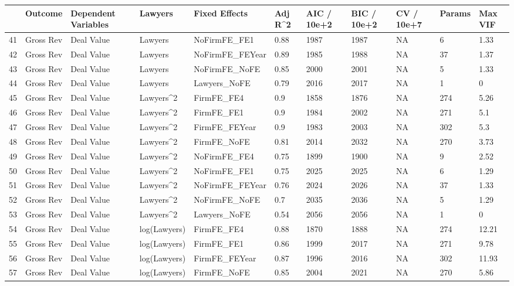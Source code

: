 \documentclass{article}
\begin{document}
\begin{table}[H]
\centering
\begin{tabular}{rllllllllll}
  \hline
 & Outcome & Dependent Variables & Lawyers & Fixed Effects & Adj R^2 & AIC / 10e+2 & BIC / 10e+2 & CV / 10e+7 & Params & Max VIF \\
  \hline
41 & Gross Rev & Deal Value & Lawyers & NoFirmFE\_FE1 & 0.88 & 1987 & 1987 & NA & 6 & 1.33 \\
  42 & Gross Rev & Deal Value & Lawyers & NoFirmFE\_FEYear & 0.89 & 1985 & 1988 & NA & 37 & 1.37 \\
  43 & Gross Rev & Deal Value & Lawyers & NoFirmFE\_NoFE & 0.85 & 2000 & 2001 & NA & 5 & 1.33 \\
  44 & Gross Rev & Deal Value & Lawyers & Lawyers\_NoFE & 0.79 & 2016 & 2017 & NA & 1 & 0 \\
  45 & Gross Rev & Deal Value & Lawyers^2 & FirmFE\_FE4 & 0.9 & 1858 & 1876 & NA & 274 & 5.26 \\
  46 & Gross Rev & Deal Value & Lawyers^2 & FirmFE\_FE1 & 0.9 & 1984 & 2002 & NA & 271 & 5.1 \\
  47 & Gross Rev & Deal Value & Lawyers^2 & FirmFE\_FEYear & 0.9 & 1983 & 2003 & NA & 302 & 5.3 \\
  48 & Gross Rev & Deal Value & Lawyers^2 & FirmFE\_NoFE & 0.81 & 2014 & 2032 & NA & 270 & 3.73 \\
  49 & Gross Rev & Deal Value & Lawyers^2 & NoFirmFE\_FE4 & 0.75 & 1899 & 1900 & NA & 9 & 2.52 \\
  50 & Gross Rev & Deal Value & Lawyers^2 & NoFirmFE\_FE1 & 0.75 & 2025 & 2025 & NA & 6 & 1.29 \\
  51 & Gross Rev & Deal Value & Lawyers^2 & NoFirmFE\_FEYear & 0.76 & 2024 & 2026 & NA & 37 & 1.33 \\
  52 & Gross Rev & Deal Value & Lawyers^2 & NoFirmFE\_NoFE & 0.7 & 2035 & 2036 & NA & 5 & 1.29 \\
  53 & Gross Rev & Deal Value & Lawyers^2 & Lawyers\_NoFE & 0.54 & 2056 & 2056 & NA & 1 & 0 \\
  54 & Gross Rev & Deal Value & log(Lawyers) & FirmFE\_FE4 & 0.88 & 1870 & 1888 & NA & 274 & 12.21 \\
  55 & Gross Rev & Deal Value & log(Lawyers) & FirmFE\_FE1 & 0.86 & 1999 & 2017 & NA & 271 & 9.78 \\
  56 & Gross Rev & Deal Value & log(Lawyers) & FirmFE\_FEYear & 0.87 & 1996 & 2016 & NA & 302 & 11.93 \\
  57 & Gross Rev & Deal Value & log(Lawyers) & FirmFE\_NoFE & 0.85 & 2004 & 2021 & NA & 270 & 5.86 \\

\end{tabular}
\end{table}
\end{document}
